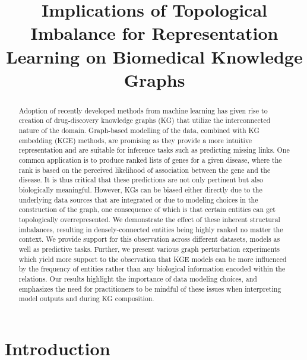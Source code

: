 \title{Implications of Topological Imbalance for Representation Learning on Biomedical Knowledge Graphs}



\maketitle

\begin{abstract}

    Adoption of recently developed methods from machine learning has given rise to creation of drug-discovery knowledge graphs (KG) that utilize the interconnected nature of the domain. Graph-based modelling of the data, combined with KG embedding (KGE) methods, are promising as they provide a more intuitive representation and are suitable for inference tasks such as predicting missing links. One common application is to produce ranked lists of genes for a given disease, where the rank is based on the perceived likelihood of association between the gene and the disease. It is thus critical that these predictions are not only pertinent but also biologically meaningful. However, KGs can be biased either directly due to the underlying data sources that are integrated or due to modeling choices in the construction of the graph, one consequence of which is that certain entities can get topologically overrepresented. We demonstrate the effect of these inherent structural imbalances, resulting in densely-connected entities being highly ranked no matter the context. We provide support for this observation across different datasets, models as well as predictive tasks. Further, we present various graph perturbation experiments which yield more support to the observation that KGE models can be more influenced by the frequency of entities rather than any biological information encoded within the relations. Our results highlight the importance of data modeling choices, and emphasizes the need for practitioners to be mindful of these issues when interpreting model outputs and during KG composition.

\end{abstract}

\section{Introduction}\label{sec:intro}

